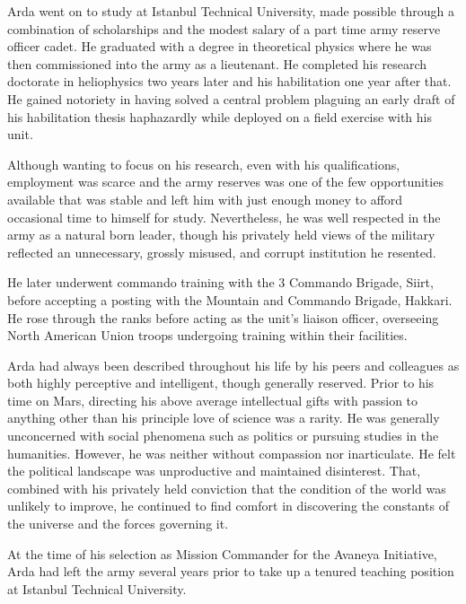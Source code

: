 Arda went on to study at Istanbul Technical University, made possible through a combination of scholarships and the modest salary of a part time army reserve officer cadet. He graduated with a degree in theoretical physics where he was then commissioned into the army as a lieutenant. He completed his research doctorate in heliophysics two years later and his habilitation one year after that. He gained notoriety in having solved a central problem plaguing an early draft of his habilitation thesis haphazardly while deployed on a field exercise with his unit.

Although wanting to focus on his research, even with his qualifications, employment was scarce and the army reserves was one of the few opportunities available that was stable and left him with just enough money to afford occasional time to himself for study. Nevertheless, he was well respected in the army as a natural born leader, though his privately held views of the military reflected an unnecessary, grossly misused, and corrupt institution he resented.

He later underwent commando training with the 3 Commando Brigade, Siirt, before accepting a posting with the Mountain and Commando Brigade, Hakkari. He rose through the ranks before acting as the unit's liaison officer, overseeing North American Union troops undergoing training within their facilities.

Arda had always been described throughout his life by his peers and colleagues as both highly perceptive and intelligent, though generally reserved. Prior to his time on Mars, directing his above average intellectual gifts with passion to anything other than his principle love of science was a rarity. He was generally unconcerned with social phenomena such as politics or pursuing studies in the humanities. However, he was neither without compassion nor inarticulate. He felt the political landscape was unproductive and maintained disinterest. That, combined with his privately held conviction that the condition of the world was unlikely to improve, he continued to find comfort in discovering the constants of the universe and the forces governing it.

At the time of his selection as Mission Commander for the Avaneya Initiative, Arda had left the army several years prior to take up a tenured teaching position at Istanbul Technical University.

